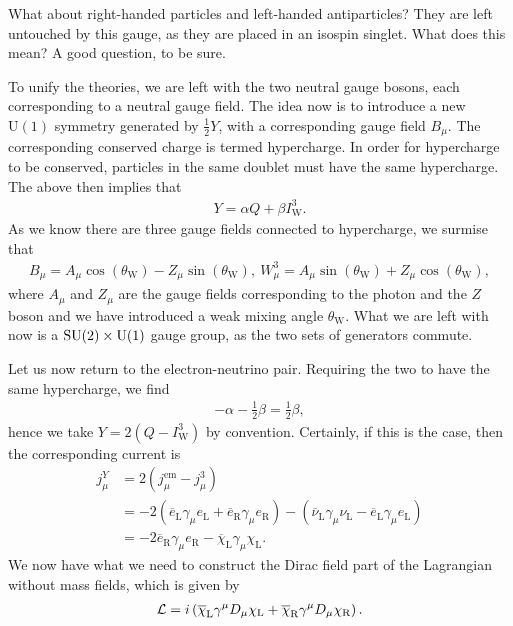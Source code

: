 What about right-handed particles and left-handed antiparticles? They are left untouched by this gauge, as they are placed in an isospin singlet. What does this mean? A good question, to be sure.

To unify the theories, we are left with the two neutral gauge bosons, each corresponding to a neutral gauge field. The idea now is to introduce a new $\text{U}(1)$ symmetry generated by $\frac{1}{2}Y$, with a corresponding gauge field $B_{\mu}$. The corresponding conserved charge is termed hypercharge. In order for hypercharge to be conserved, particles in the same doublet must have the same hypercharge. The above then implies that
\begin{align*}
	Y = \alpha Q + \beta I_{\text{W}}^{3}.
\end{align*}       
As we know there are three gauge fields connected to hypercharge, we surmise that
\begin{align*}
	B_{\mu} = A_{\mu}\cos(\theta_{\text{W}}) - Z_{\mu}\sin(\theta_{\text{W}}),\ W_{\mu}^{3} = A_{\mu}\sin(\theta_{\text{W}}) + Z_{\mu}\cos(\theta_{\text{W}}),
\end{align*}
where $A_{\mu}$ and $Z_{\mu}$ are the gauge fields corresponding to the photon and the $Z$ boson and we have introduced a weak mixing angle $\theta_{\text{W}}$. What we are left with now is a $\text{SU}(2)\times\text{U}(1)$ gauge group, as the two sets of generators commute.

Let us now return to the electron-neutrino pair. Requiring the two to have the same hypercharge, we find
\begin{align*}
	-\alpha - \frac{1}{2}\beta = \frac{1}{2}\beta,
\end{align*}
hence we take $Y = 2(Q - I_{\text{W}}^{3})$ by convention. Certainly, if this is the case, then the corresponding current is
\begin{align*}
	j_{\mu}^{Y} &= 2\left(j_{\mu}^{\text{em}} - j_{\mu}^{3}\right) \\
	            &= -2\left(\overline{e}_{\text{L}}\gamma_{\mu}e_{\text{L}} + \overline{e}_{\text{R}}\gamma_{\mu}e_{\text{R}}\right) -\left(\overline{\nu}_{\text{L}}\gamma_{\mu}\nu_{\text{L}} - \overline{e}_{\text{L}}\gamma_{\mu}e_{\text{L}}\right) \\
	            &= -2\overline{e}_{\text{R}}\gamma_{\mu}e_{\text{R}} - \overline{\chi}_{\text{L}}\gamma_{\mu}\chi_{\text{L}}.
\end{align*}
We now have what we need to construct the Dirac field part of the Lagrangian without mass fields, which is given by
\begin{align*}
	\mathcal{L} = i\left(\overline{\chi}_{\text{L}}\gamma^{\mu}D_{\mu}\chi_{\text{L}} + \overline{\chi}_{\text{R}}\gamma^{\mu}D_{\mu}\chi_{\text{R}}\right).
\end{align*}

